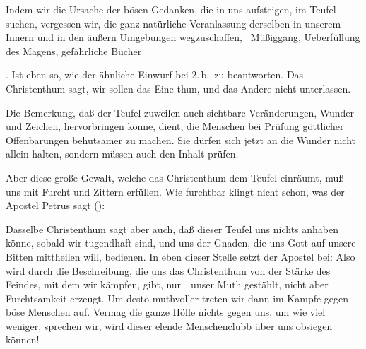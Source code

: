 \begin{aufza}
\begin{aufzb}
 Indem wir die Ursache der bösen Gedanken, die in uns aufsteigen, im Teufel suchen, vergessen wir, die ganz natürliche Veranlassung derselben in unserem Innern und in den äußern Umgebungen wegzuschaffen, \zB\ Müßiggang, Ueberfüllung des Magens, gefährliche Bücher \udgl\par
{}. Ist eben so, wie der ähnliche Einwurf bei 2.\,b.\ zu beantworten. Das Christenthum sagt, wir sollen das Eine thun, und das Andere nicht unterlassen.
\item  Die Bemerkung, daß der Teufel zuweilen auch sichtbare Veränderungen, Wunder und Zeichen, hervorbringen könne, dient, die Menschen bei Prüfung göttlicher Offenbarungen behutsamer zu machen. Sie dürfen sich jetzt an die Wunder nicht allein halten, sondern müssen auch den Inhalt prüfen.\par
{} Aber diese große Gewalt, welche das Christenthum dem Teufel einräumt, muß uns mit Furcht und Zittern erfüllen. Wie furchtbar klingt nicht schon, was der Apostel Petrus sagt (): \par
{} Dasselbe Christenthum sagt aber auch, daß dieser Teufel uns nichts anhaben könne, sobald wir tugendhaft sind, und uns der Gnaden, die uns Gott auf unsere Bitten mittheilen will, bedienen. In eben dieser Stelle setzt der Apostel bei:  Also wird durch die Beschreibung, die uns das Christenthum von der Stärke des Feindes, mit dem wir kämpfen, gibt, nur~\ unser Muth gestählt, nicht aber Furchtsamkeit erzeugt. Um desto muthvoller treten wir dann im Kampfe gegen böse Menschen auf. Vermag die ganze Hölle nichts gegen uns, um wie viel weniger, sprechen wir, wird dieser elende Menschenclubb über uns obsiegen können!
\end{aufzb}
\end{aufza}

